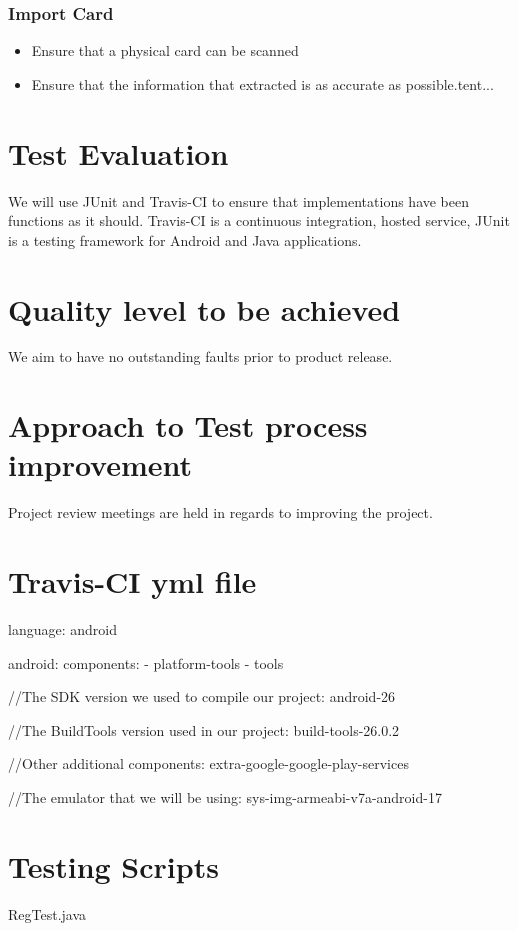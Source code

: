 \documentclass[english]{article}
\begin{document}
		\subsubsection{Import Card}
		\begin{itemize}
			\item Ensure that a physical card can be scanned
			\item Ensure that the information that extracted is as accurate as possible.tent...
		\end{itemize}
		
			
	
		

	\section{Test Evaluation}
	
	We will use JUnit and  Travis-CI to ensure that implementations have been functions as it should.
	Travis-CI is a continuous integration, hosted service,  JUnit is a testing framework for Android and Java applications.
	\section{Quality level to be achieved}
	We aim to have no outstanding faults prior to product release.
	
	\section{Approach to Test process improvement}
	
	Project review meetings are held in regards to improving the project.
	
	 
	
	\section{Travis-CI yml file}
	language: android
	
	android:
	components:
	- platform-tools
	- tools
	
	
	//The SDK version we used to compile our project:
	 android-26
	
	//The BuildTools version used in our project: 
	 build-tools-26.0.2
	
	//Other additional components:  extra-google-google-play-services
	
	//The emulator that we will be using:
	 sys-img-armeabi-v7a-android-17	
	 
	\section{Testing Scripts}
	
	RegTest.java
		
\end{document}
